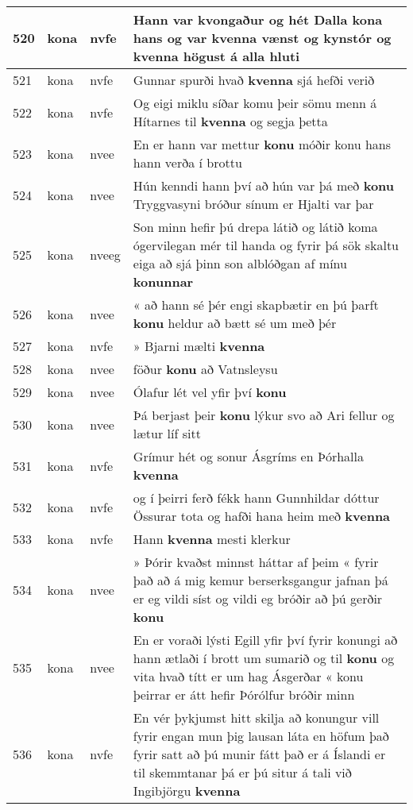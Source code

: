 \documentclass{article}
\begin{document}
\begin{longtable}{p{1cm}|p{1cm}|p{1cm}|p{13cm}}
\hline
520&kona&nvfe&Hann var kvongaður og hét Dalla kona hans og var \textbf{kvenna} vænst og kynstór og kvenna högust á alla hluti\\
\hline
521&kona&nvfe&Gunnar spurði hvað \textbf{kvenna} sjá hefði verið\\
\hline
522&kona&nvfe&Og eigi miklu síðar komu þeir sömu menn á Hítarnes til \textbf{kvenna} og segja þetta\\
\hline
523&kona&nvee&En er hann var mettur \textbf{konu} móðir konu hans hann verða í brottu\\
\hline
524&kona&nvee&Hún kenndi hann því að hún var þá með \textbf{konu} Tryggvasyni bróður sínum er Hjalti var þar\\
\hline
525&kona&nveeg&Son minn hefir þú drepa látið og látið koma ógervilegan mér til handa og fyrir þá sök skaltu eiga að sjá þinn son alblóðgan af mínu \textbf{konunnar} \\
\hline
526&kona&nvee&« að hann sé þér engi skapbætir en þú þarft \textbf{konu} heldur að bætt sé um með þér\\
\hline
527&kona&nvfe&» Bjarni mælti \textbf{kvenna} \\
\hline
528&kona&nvee&föður \textbf{konu} að Vatnsleysu\\
\hline
529&kona&nvee&Ólafur lét vel yfir því \textbf{konu} \\
\hline
530&kona&nvee&Þá berjast þeir \textbf{konu} lýkur svo að Ari fellur og lætur líf sitt\\
\hline
531&kona&nvfe&Grímur hét og sonur Ásgríms en Þórhalla \textbf{kvenna} \\
\hline
532&kona&nvfe&og í þeirri ferð fékk hann Gunnhildar dóttur Össurar tota og hafði hana heim með \textbf{kvenna} \\
\hline
533&kona&nvfe&Hann \textbf{kvenna} mesti klerkur\\
\hline
534&kona&nvee&» Þórir kvaðst minnst háttar af þeim « fyrir það að á mig kemur berserksgangur jafnan þá er eg vildi síst og vildi eg bróðir að þú gerðir \textbf{konu} \\
\hline
535&kona&nvee&En er voraði lýsti Egill yfir því fyrir konungi að hann ætlaði í brott um sumarið og til \textbf{konu} og vita hvað títt er um hag Ásgerðar « konu þeirrar er átt hefir Þórólfur bróðir minn\\
\hline
536&kona&nvfe&En vér þykjumst hitt skilja að konungur vill fyrir engan mun þig lausan láta en höfum það fyrir satt að þú munir fátt það er á Íslandi er til skemmtanar þá er þú situr á tali við Ingibjörgu \textbf{kvenna} \\

\end{longtable}
\end{document}

